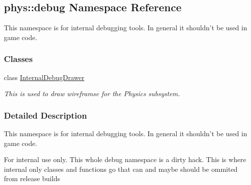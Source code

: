 \hypertarget{namespacephys_1_1debug}{
\subsection{phys::debug Namespace Reference}
\label{d0/d53/namespacephys_1_1debug}
}


This namespace is for internal debugging tools. In general it shouldn't be used in game code.  


\subsubsection*{Classes}
\begin{DoxyCompactItemize}
\item 
class \hyperlink{classphys_1_1debug_1_1InternalDebugDrawer}{InternalDebugDrawer}
\begin{DoxyCompactList}\small\item\em This is used to draw wireframse for the Physics subsystem. \item\end{DoxyCompactList}\end{DoxyCompactItemize}


\subsubsection{Detailed Description}
This namespace is for internal debugging tools. In general it shouldn't be used in game code. \begin{DoxyInternal}{For internal use only.}
This whole debug namespace is a dirty hack. This is where internal only classes and functions go that can and maybe should be ommited from release builds \end{DoxyInternal}
